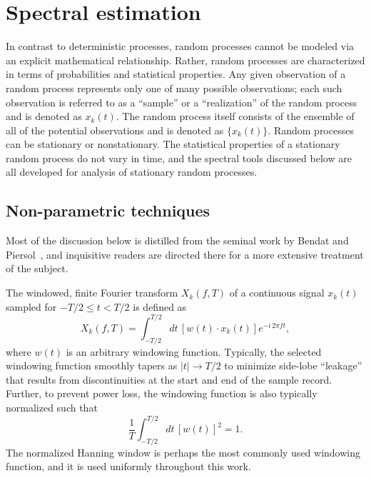 \chapter{Spectral estimation}
\label{app:SpectralEstimation}
In contrast to deterministic processes,
random processes cannot be modeled via an explicit mathematical relationship.
Rather, random processes are characterized
in terms of probabilities and statistical properties.
Any given observation of a random process represents
only one of many possible observations;
each such observation is referred to as
a ``sample'' or a ``realization'' of the random process
and is denoted as $x_k(t)$.
The random process itself consists of
the ensemble of all of the potential observations
and is denoted as $\{x_k(t)\}$.
Random processes can be stationary or nonstationary.
The statistical properties of a stationary random process
do not vary in time, and
the spectral tools discussed below
are all developed for analysis of stationary random processes.


\section{Non-parametric techniques}
\label{app:SpectralEstimation:NonParametric}
Most of the discussion below is distilled from
the seminal work by Bendat and Piersol~\cite{bendat_and_piersol}, and
inquisitive readers are directed there
for a more extensive treatment of the subject.

The windowed, finite Fourier transform $X_k(f, T)$
of a continuous signal $x_k(t)$
sampled for $-T / 2 \leq t < T / 2$
is defined as
\begin{equation}
  X_k(f, T)
  =
  \int_{-T / 2}^{T / 2}
  dt \, [w(t) \cdot x_k(t)] e^{-i \, 2 \pi f t},
  \label{eq:SpectralEstimation:finite_Fourier_transform}
\end{equation}
where $w(t)$ is an arbitrary windowing function.
Typically, the selected windowing function smoothly tapers
as $|t| \rightarrow T / 2$
to minimize side-lobe ``leakage''
that results from discontinuities at the start and end of the sample record.
Further, to prevent power loss, the windowing function
is also typically normalized such that
\begin{equation}
  \frac{1}{T} \int_{-T/2}^{T/2} dt \, [w(t)]^2 = 1.
\end{equation}
The normalized Hanning window is perhaps
the most commonly used windowing function, and
it is used uniformly throughout this work.

